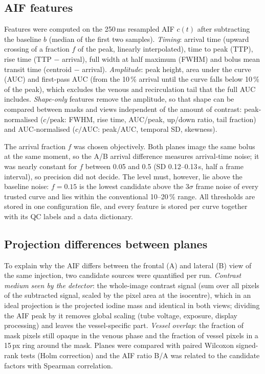 \subsection{AIF features}
\label{sec:features}
Features were computed on the 250\,ms resampled AIF $c(t)$ after subtracting the baseline $b$ (median of the
first two samples). \emph{Timing}: arrival time (upward crossing of a fraction $f$ of the peak, linearly
interpolated), time to peak (TTP), rise time (TTP $-$ arrival), full width at half maximum (FWHM) and bolus mean
transit time (centroid $-$ arrival). \emph{Amplitude}: peak height, area under the curve (AUC) and first-pass AUC
(from the 10\,\% arrival until the curve falls below 10\,\% of the peak), which excludes the venous and
recirculation tail that the full AUC includes. \emph{Shape-only} features remove the amplitude, so that shape can
be compared between masks and views independent of the amount of contrast: peak-normalised ($c/\mathrm{peak}$:
FWHM, rise time, AUC/peak, up/down ratio, tail fraction) and AUC-normalised ($c/\mathrm{AUC}$: peak/AUC, temporal
SD, skewness).

The arrival fraction $f$ was chosen objectively. Both planes image the same bolus at the same moment, so the A/B
arrival difference measures arrival-time noise; it was nearly constant for $f$ between 0.05 and 0.5 (SD
0.12--0.13\,s, half a frame interval), so precision did not decide. The level must, however, lie above the
baseline noise: $f = 0.15$ is the lowest candidate above the 3$\sigma$ frame noise of every trusted curve and lies
within the conventional 10--20\,\% range. All thresholds are stored in one configuration file, and every feature
is stored per curve together with its QC labels and a data dictionary.

\subsection{Projection differences between planes}
\label{sec:plane_methods}
To explain why the AIF differs between the frontal (A) and lateral (B) view of the same injection, two
candidate sources were quantified per run. \emph{Contrast medium seen by the detector}: the whole-image contrast
signal (sum over all pixels of the subtracted signal, scaled by the pixel area at the isocentre), which in an
ideal projection is the projected iodine mass and identical in both views; dividing the AIF peak by it removes
global scaling (tube voltage, exposure, display processing) and leaves the vessel-specific part.
\emph{Vessel overlap}: the fraction of mask pixels still opaque in the venous phase and the fraction of vessel
pixels in a 15\,px ring around the mask. Planes were compared with paired Wilcoxon signed-rank tests (Holm
correction) and the AIF ratio B/A was related to the candidate factors with Spearman correlation.

